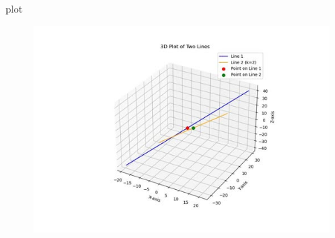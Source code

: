 \documentclass{beamer}
\begin{document}
\begin{frame}{plot}
\begin{figure}[h]
    \centering
    \includegraphics[scale=0.5]{figs/4.13.85.png}
    \caption{}
    \label{fig:1}
\end{figure}
\end{frame}
\end{document}
